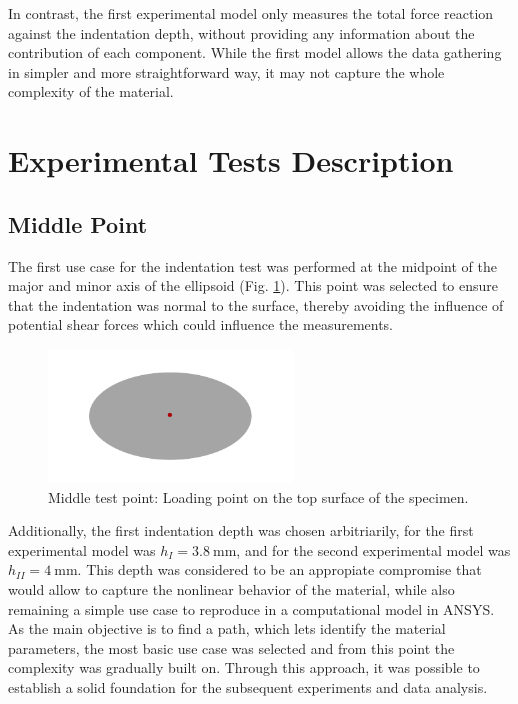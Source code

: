 In contrast, the first experimental model only measures the total force reaction 
against the indentation depth, without providing any information about the contribution 
of each component. While the first model allows the data 
gathering in simpler and more straightforward way, it may not capture 
the whole complexity of the material.

\section{Experimental Tests Description}

\subsection{Middle Point}
\label{subsection:midpoint}
The first use case for the indentation test was performed at the midpoint 
of the major and minor axis of the ellipsoid (Fig. \ref{fig:midpoint}). This point was selected 
to ensure that the indentation was normal to the surface, thereby avoiding 
the influence of potential shear forces which could influence the 
measurements.

\begin{figure}%
    \centering
   \quad
   \includegraphics[width=6.5cm]{Images/Experiment/specimenmidp.png}%
   \caption{Middle test point: Loading point on the top surface of the specimen.}%
   \label{fig:midpoint}%
\end{figure}

Additionally, the first indentation depth was chosen arbitriarily, for the first 
experimental model was $h_{I} = \SI{3.8}{\milli \m}$, and for the second 
experimental model was $h_{II} = \SI{4}{\milli \m}$. This depth was considered 
to be an appropiate compromise that would allow to capture the nonlinear 
behavior of the material, while also remaining a simple use case to 
reproduce in a computational model in ANSYS.\\

As the main objective is to find a path, which lets identify the material 
 parameters, the most basic use case was selected and from this point 
the complexity was gradually built on. Through this approach, it was possible 
to establish a solid foundation for the subsequent experiments and data analysis.



